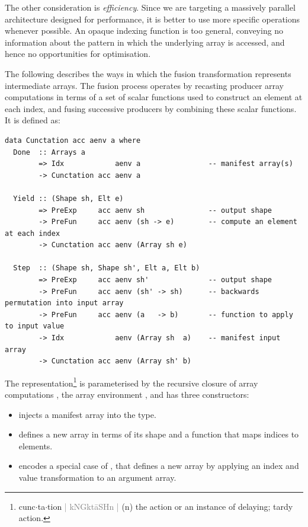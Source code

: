 The other consideration is \emph{efficiency}. Since we are targeting a massively
parallel architecture designed for performance, it is better to use more
specific operations whenever possible. An opaque indexing function is too
general, conveying no information about the pattern in which the underlying
array is accessed, and hence no opportunities for optimisation.

The following describes the ways in which the fusion transformation represents
intermediate arrays. The fusion process operates by recasting producer array
computations in terms of a set of scalar functions used to construct an element
at each index, %
and fusing successive producers by combining these scalar functions. It is
defined as:
%
\begin{lstlisting}[style=haskell
    ,label=lst:cunctation
    ,caption={Representation of fusible producer arrays}]
data Cunctation acc aenv a where
  Done  :: Arrays a
        => Idx            aenv a                -- manifest array(s)
        -> Cunctation acc aenv a

  Yield :: (Shape sh, Elt e)
        => PreExp     acc aenv sh               -- output shape
        -> PreFun     acc aenv (sh -> e)        -- compute an element at each index
        -> Cunctation acc aenv (Array sh e)

  Step  :: (Shape sh, Shape sh', Elt a, Elt b)
        => PreExp     acc aenv sh'              -- output shape
        -> PreFun     acc aenv (sh' -> sh)      -- backwards permutation into input array
        -> PreFun     acc aenv (a   -> b)       -- function to apply to input value
        -> Idx            aenv (Array sh  a)    -- manifest input array
        -> Cunctation acc aenv (Array sh' b)
\end{lstlisting}
%
The representation\footnote{%
cunc$\cdot$ta$\cdot$tion
\textcolor{gray}{|
kNGk\textquotesingle t\={a}SHn
\enspace{}\textquotesingle {}
|} (n) the action or an instance of delaying; tardy action.}
%
is parameterised by the recursive closure of array computations , the
array environment , and has three constructors:
%
\begin{itemize}
\item {} injects a manifest array into the type.

\item {} defines a new array in terms of its shape and a function
    that maps indices to elements.

\item {} encodes a special case of , that defines a new
    array by applying an index and value transformation to an argument array.

\end{itemize}

